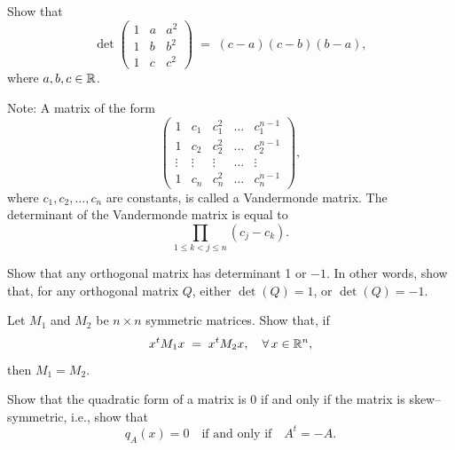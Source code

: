 \begin{exercises}

\item Show that
\[
\det\begin{pmatrix} 1 & a & a^2 \\ 1 & b & b^2 \\ 1 & c & c^2 \end{pmatrix}
\;=\; (c-a)(c-b)(b-a),
\]
where $a,b,c \in \mathbb{R}$.

Note: A matrix of the form
\[
\begin{pmatrix} 1 & c_1 & c_1^2 & \ldots & c_1^{n-1} \\
1 & c_2 & c_2^2 & \ldots & c_2^{n-1} \\
\vdots & \vdots & \vdots & \ldots & \vdots \\
1 & c_n & c_n^2 & \ldots & c_n^{n-1} \end{pmatrix},
\]
where $c_1, c_2, \ldots, c_n$ are constants, is called a Vandermonde matrix. The
determinant of the Vandermonde matrix is equal to
\[
\prod_{1 \le k < j \le n} (c_j - c_k).
\]

\item Show that any orthogonal matrix has determinant 1 or $-1$. In other words,
show that, for any orthogonal matrix $Q$, either $\det(Q) = 1$, or $\det(Q) = -1$.

\item Let $M_1$ and $M_2$ be $n \times n$ symmetric matrices. Show that, if
\[
x^tM_1x \;=\; x^tM_2x, \quad \forall\, x \in \mathbb{R}^n,
\]
then $M_1 = M_2$.

\item Show that the quadratic form of a matrix is 0 if and only if the matrix is
skew--symmetric, i.e., show that
\[
q_A(x) = 0 \quad \text{if and only if} \quad A^t = -A.
\]

\end{exercises}

